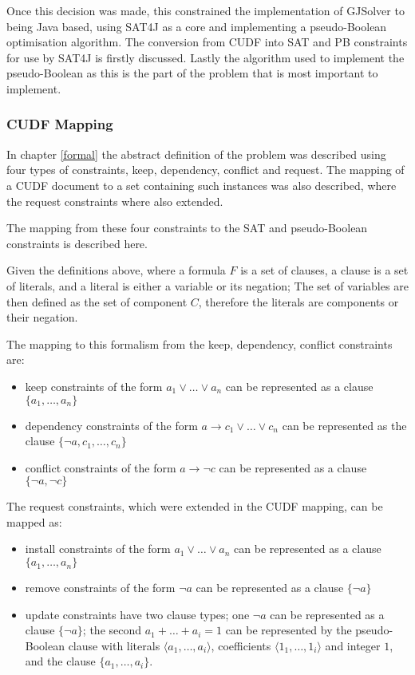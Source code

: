 Once this decision was made, this constrained the implementation of GJSolver to being Java based, 
using SAT4J as a core and implementing a pseudo-Boolean optimisation algorithm.
The conversion from CUDF into SAT and PB constraints for use by SAT4J is firstly discussed.
Lastly the algorithm used to implement the pseudo-Boolean as this is the part of the problem that is most important to implement.

\subsubsection{CUDF Mapping}
In chapter \ref{formal} the abstract definition of the problem was described using four types of constraints, keep, dependency, conflict and request.
The mapping of a CUDF document to a set containing such instances was also described, where the request constraints where also extended.

The mapping from these four constraints to the SAT and pseudo-Boolean constraints is described here.

Given the definitions above, where a formula $F$ is a set of clauses, a clause is a set of literals, and a literal is either a variable or its negation;
The set of variables are then defined as the set of component $C$, therefore the literals are components or their negation.

The mapping to this formalism from the keep, dependency, conflict constraints are: 
\begin{itemize}
  \item keep constraints of the form $a_1\vee \ldots \vee a_n$  can be represented as a clause $\{a_1,\ldots,a_n\}$
  \item dependency constraints of the form $a \rightarrow c_1 \vee \ldots \vee c_n$ can be represented as the clause $\{\neg a, c_1, \ldots, c_n\}$
  \item conflict constraints of the form $a \rightarrow \neg c$ can be represented as a clause $\{\neg a, \neg c\}$
\end{itemize}

The request constraints, which were extended in the CUDF mapping, can be mapped as:
\begin{itemize}
      \item install constraints of the form $a_1 \vee \ldots \vee a_n$  can be represented as a clause $\{a_1,\ldots,a_n\}$
      \item remove constraints of the form $\neg a$ can be represented as a clause $\{\neg a\}$
      \item update constraints have two clause types; one $\neg a$ can be represented as a clause $\{\neg a\}$;
      the second $a_1 + \ldots + a_i = 1$ can be represented by the pseudo-Boolean clause with literals $\langle a_1,\ldots,a_i\rangle$, coefficients $\langle 1_1,\ldots,1_i \rangle$
      and integer $1$, and the clause $\{a_1,\ldots,a_i\}$.
\end{itemize}

